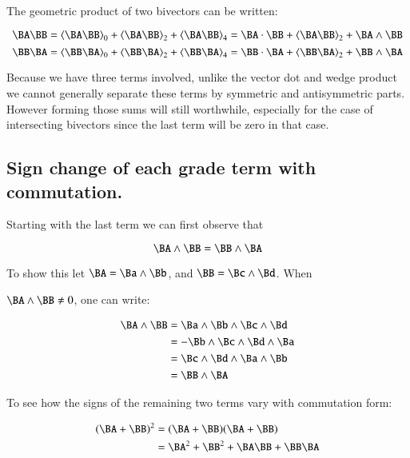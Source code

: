 The geometric product of two bivectors can be written:

\begin{equation}
\label{eqn:bivector:ABprod}
\BA \BB = 
\gpgrade{\BA \BB}{0}
+\gpgrade{\BA \BB}{2}
+\gpgrade{\BA \BB}{4}
= 
{\BA \cdot \BB}
+\gpgrade{\BA \BB}{2}
+{\BA \wedge \BB}
\end{equation}
\begin{equation}
\label{eqn:bivector:BAprod}
\BB \BA = 
\gpgrade{\BB \BA}{0}
+\gpgrade{\BB \BA}{2}
+\gpgrade{\BB \BA}{4}
= 
{\BB \cdot \BA}
+\gpgrade{\BB \BA}{2}
+{\BB \wedge \BA}
\end{equation}

Because we have three terms involved, unlike the vector dot and wedge product we cannot generally separate these terms by symmetric and antisymmetric parts.  However forming those sums will still worthwhile, especially for the case of intersecting bivectors since the last term will be zero in that case.

\subsection{Sign change of each grade term with commutation. }

Starting with the last term we can first observe that

\begin{equation}
\label{eqn:bivector:wedgesign}
\BA \wedge \BB = \BB \wedge \BA
\end{equation}

To show this let $\BA = \Ba \wedge \Bb$, and $\BB = \Bc \wedge \Bd$.  When

$\BA \wedge \BB \ne 0$, one can write:

\begin{align*}
\BA \wedge \BB 
&= \Ba \wedge \Bb \wedge \Bc \wedge \Bd \\
&= - \Bb \wedge \Bc \wedge \Bd \wedge \Ba \\
&= \Bc \wedge \Bd \wedge \Ba \wedge \Bb \\
&= \BB \wedge \BA \\
\end{align*}

To see how the signs of the remaining two terms vary with commutation form:

\begin{align*}
(\BA + \BB)^2
&= (\BA + \BB)(\BA + \BB) \\
&= \BA^2 + \BB^2 + \BA \BB + \BB \BA \\
\end{align*}

